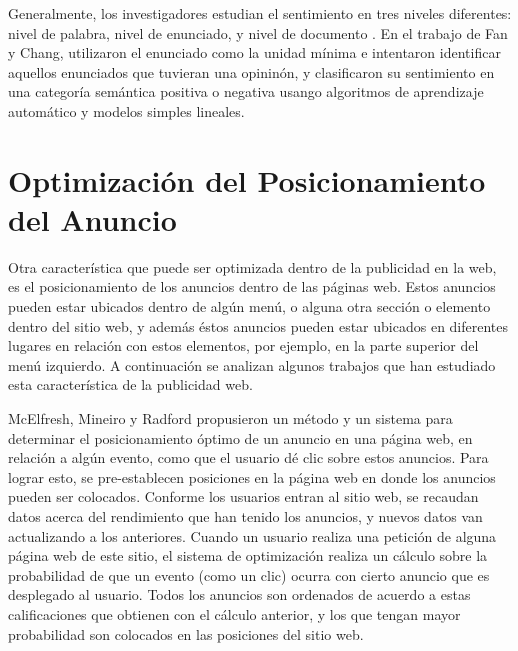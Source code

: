 Generalmente, los investigadores estudian el sentimiento en tres
niveles diferentes: nivel de palabra, nivel de enunciado, y nivel de
documento \cite{kim2004determining} \cite{kim2006automatic}. En el
trabajo de Fan y Chang, utilizaron el enunciado como la unidad mínima
e intentaron identificar aquellos enunciados que tuvieran una
opininón, y clasificaron su sentimiento en una categoría semántica
positiva o negativa usango algoritmos de aprendizaje automático y
modelos simples lineales.

\clearpage
\section{Optimización del Posicionamiento del Anuncio}

Otra característica que puede ser optimizada dentro de la publicidad
en la web, es el posicionamiento de los anuncios dentro de las páginas
web. Estos anuncios pueden estar ubicados dentro de algún menú, o
alguna otra sección o elemento dentro del sitio web, y además éstos
anuncios pueden estar ubicados en diferentes lugares en relación con
estos elementos, por ejemplo, en la parte superior del menú
izquierdo. A continuación se analizan algunos trabajos que han
estudiado esta característica de la publicidad web.

McElfresh, Mineiro y Radford \cite{mcelfresh2005method} propusieron un
método y un sistema para determinar el posicionamiento óptimo de un
anuncio en una página web, en relación a algún evento, como que el
usuario dé clic sobre estos anuncios. Para lograr esto, se
pre-establecen posiciones en la página web en donde los anuncios
pueden ser colocados. Conforme los usuarios entran al sitio web, se
recaudan datos acerca del rendimiento que han tenido los anuncios, y
nuevos datos van actualizando a los anteriores. Cuando un usuario
realiza una petición de alguna página web de este sitio, el sistema de
optimización realiza un cálculo sobre la probabilidad de que un evento
(como un clic) ocurra con cierto anuncio que es desplegado al
usuario. Todos los anuncios son ordenados de acuerdo a estas
calificaciones que obtienen con el cálculo anterior, y los que tengan
mayor probabilidad son colocados en las posiciones del sitio web.











